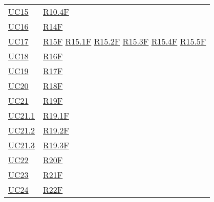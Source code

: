 \begin{center}
\begin{longtable}[!h]{m{50px} m{50px}}
        \hyperref[sec:UC15]{UC15}         & \hyperref[tab:RequisitiFunzionali]{R10.4F}  \\

        \hyperref[sec:UC16]{UC16}         & \hyperref[tab:RequisitiFunzionali]{R14F}    \\

        \hyperref[sec:UC17]{UC17}         & \hyperref[tab:RequisitiFunzionali]{R15F}
        \newline \hyperref[tab:RequisitiFunzionali]{R15.1F}
        \newline \hyperref[tab:RequisitiFunzionali]{R15.2F}
        \newline \hyperref[tab:RequisitiFunzionali]{R15.3F}
        \newline \hyperref[tab:RequisitiFunzionali]{R15.4F}
        \newline \hyperref[tab:RequisitiFunzionali]{R15.5F}                             \\

        \hyperref[sec:UC18]{UC18}         & \hyperref[tab:RequisitiFunzionali]{R16F}    \\

        \hyperref[sec:UC19]{UC19}         & \hyperref[tab:RequisitiFunzionali]{R17F}    \\

        \hyperref[sec:UC20]{UC20}         & \hyperref[tab:RequisitiFunzionali]{R18F}    \\

        \hyperref[sec:UC21]{UC21}         & \hyperref[tab:RequisitiFunzionali]{R19F}    \\

        \hyperref[sec:UC21.1]{UC21.1}     & \hyperref[tab:RequisitiFunzionali]{R19.1F}  \\

        \hyperref[sec:UC21.2]{UC21.2}     & \hyperref[tab:RequisitiFunzionali]{R19.2F}  \\

        \hyperref[sec:UC21.3]{UC21.3}     & \hyperref[tab:RequisitiFunzionali]{R19.3F}  \\

        \hyperref[sec:UC22]{UC22}         & \hyperref[tab:RequisitiFunzionali]{R20F}    \\

        \hyperref[sec:UC23]{UC23}         & \hyperref[tab:RequisitiFunzionali]{R21F}    \\

        \hyperref[sec:UC24]{UC24}         & \hyperref[tab:RequisitiFunzionali]{R22F}    \\


\end{longtable}
\end{center}
